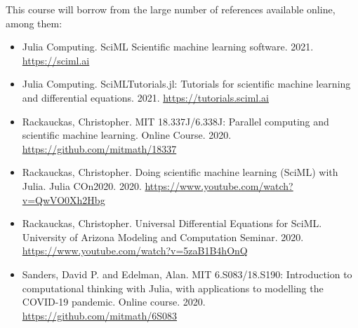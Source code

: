 \documentclass[10pt, a4paper]{article}
\begin{document}
This course will borrow from the large number of references available online, among them:

\begin{itemize}

    \item Julia Computing. SciML Scientific machine learning software. 2021. \url{https://sciml.ai}

    \item Julia Computing. SciMLTutorials.jl: Tutorials for scientific machine learning and differential equations. 2021. \url{https://tutorials.sciml.ai}

    \item  Rackauckas, Christopher. MIT 18.337J/6.338J: Parallel computing and scientific machine learning. Online Course. 2020. \url{https://github.com/mitmath/18337}

    \item  Rackauckas, Christopher. Doing scientific machine learning (SciML) with Julia. Julia COn2020. 2020. \url{https://www.youtube.com/watch?v=QwVO0Xh2Hbg}

    \item  Rackauckas, Christopher. Universal Differential Equations for SciML. University of Arizona Modeling and Computation Seminar. 2020. \url{https://www.youtube.com/watch?v=5zaB1B4hOnQ}

    \item Sanders, David P. and Edelman, Alan. MIT 6.S083/18.S190: Introduction to computational thinking with Julia, with applications to modelling the COVID-19 pandemic. Online course. 2020. \url{https://github.com/mitmath/6S083}

\end{itemize}
\end{document}

